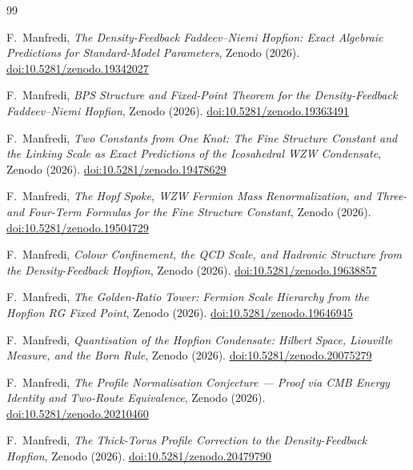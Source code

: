 \documentclass[11pt,a4paper]{article}
\theoremstyle{definition}
\theoremstyle{remark}
\begin{document}
\begin{thebibliography}{99}

F.~Manfredi,
\textit{The Density-Feedback Faddeev--Niemi Hopfion:
  Exact Algebraic Predictions for Standard-Model Parameters},
Zenodo (2026).
\href{https://doi.org/10.5281/zenodo.19342027}{doi:10.5281/zenodo.19342027}

F.~Manfredi,
\textit{BPS Structure and Fixed-Point Theorem for the
  Density-Feedback Faddeev--Niemi Hopfion},
Zenodo (2026).
\href{https://doi.org/10.5281/zenodo.19363491}{doi:10.5281/zenodo.19363491}

F.~Manfredi,
\textit{Two Constants from One Knot: The Fine Structure Constant and
  the Linking Scale as Exact Predictions of the Icosahedral WZW Condensate},
Zenodo (2026).
\href{https://doi.org/10.5281/zenodo.19478629}{doi:10.5281/zenodo.19478629}

F.~Manfredi,
\textit{The Hopf Spoke, WZW Fermion Mass Renormalization,
  and Three- and Four-Term Formulas for the Fine Structure Constant},
Zenodo (2026).
\href{https://doi.org/10.5281/zenodo.19504729}{doi:10.5281/zenodo.19504729}

F.~Manfredi,
\textit{Colour Confinement, the QCD Scale, and Hadronic Structure
  from the Density-Feedback Hopfion},
Zenodo (2026).
\href{https://doi.org/10.5281/zenodo.19638857}{doi:10.5281/zenodo.19638857}

F.~Manfredi,
\textit{The Golden-Ratio Tower: Fermion Scale Hierarchy from the Hopfion RG Fixed Point},
Zenodo (2026).
\href{https://doi.org/10.5281/zenodo.19646945}{doi:10.5281/zenodo.19646945}

F.~Manfredi,
\textit{Quantisation of the Hopfion Condensate: Hilbert Space,
  Liouville Measure, and the Born Rule},
Zenodo (2026).
\href{https://doi.org/10.5281/zenodo.20075279}{doi:10.5281/zenodo.20075279}

F.~Manfredi,
\textit{The Profile Normalisation Conjecture ---
  Proof via CMB Energy Identity and Two-Route Equivalence},
Zenodo (2026).
\href{https://doi.org/10.5281/zenodo.20210460}{doi:10.5281/zenodo.20210460}

F.~Manfredi,
\textit{The Thick-Torus Profile Correction to the Density-Feedback Hopfion},
Zenodo (2026).
\href{https://doi.org/10.5281/zenodo.20479790}{doi:10.5281/zenodo.20479790}


\end{thebibliography}
\end{document}
